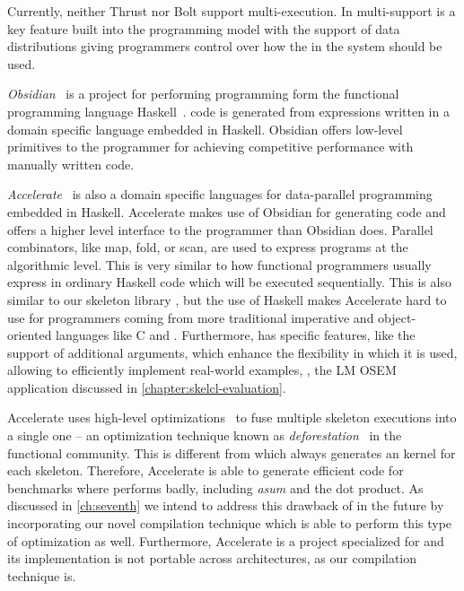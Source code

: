 Currently, neither Thrust nor Bolt support multi-\GPU execution.
In \SkelCL multi-\GPU support is a key feature built into the programming model with the support of data distributions giving programmers control over how the \GPUs in the system should be used.

\bigskip

\emph{Obsidian}~\cite{SvenssonSC08,SvenssonCS10} is a project for performing \GPU programming form the functional programming language Haskell~\cite{HudakPWBFFGHHJKNPP92}.
\GPU code is generated from expressions written in a domain specific language embedded in Haskell.
Obsidian offers low-level primitives to the programmer for achieving competitive performance with manually written \CUDA code.

\emph{Accelerate}~\cite{ChakravartyKLMG11,McDonellCKL13} is also a domain specific languages for data-parallel programming embedded in Haskell.
Accelerate makes use of Obsidian for generating \GPU code and offers a higher level interface to the programmer than Obsidian does.
Parallel combinators, like map, fold, or scan, are used to express programs at the algorithmic level.
This is very similar to how functional programmers usually express in ordinary Haskell code which will be executed sequentially.
This is also similar to our skeleton library \SkelCL, but the use of Haskell makes Accelerate hard to use for programmers coming from more traditional imperative and object-oriented languages like C and \Cpp.
Furthermore, \SkelCL has specific features, like the support of additional arguments, which enhance the flexibility in which it is used, allowing to efficiently implement real-world examples, \eg, the LM OSEM application discussed in \autoref{chapter:skelcl-evaluation}.

Accelerate uses high-level optimizations~\cite{McDonellCKL13} to fuse multiple skeleton executions into a single one -- an optimization technique known as \emph{deforestation}~\cite{Wadler90} in the functional community.
This is different from \SkelCL which always generates an \OpenCL kernel for each skeleton.
Therefore, Accelerate is able to generate efficient code for benchmarks where \SkelCL performs badly, including \emph{asum} and the dot product.
As discussed in \autoref{ch:seventh} we intend to address this drawback of \SkelCL in the future by incorporating our novel compilation technique which is able to perform this type of optimization as well.
Furthermore, Accelerate is a project specialized for \GPUs and its implementation is not portable across architectures, as our compilation technique is.

